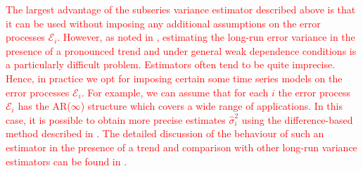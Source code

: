 \documentclass[a4paper,12pt]{article}
\makeatletter
\renewcommand{\eqref}[1]{\tagform@{\ref{#1}}}
\makeatother
\begin{document}
\textcolor{red}{The largest advantage of the subseries variance estimator described above is that it can be used without imposing any additional assumptions on the error processes $\mathcal{E}_i$. However, as noted in \cite{KhismatullinaVogt2020}, estimating the long-run error variance in the presence of a pronounced trend and under general weak dependence conditions is a particularly difficult problem. Estimators often tend to be quite imprecise. Hence, in practice we opt for imposing certain some time series models on the error processes $\mathcal{E}_i$. For example, we can assume that for each $i$ the error process $\mathcal{E}_i$ has the AR($\infty$) structure which covers a wide range of applications. In this case, it is possible to obtain more precise estimates $\widehat{\sigma}_i^2$ using the difference-based method described in \cite{KhismatullinaVogt2020}. %
The detailed discussion of the behaviour of such an estimator in the presence of a trend and comparison with other long-run variance estimators can be found in \cite{KhismatullinaVogt2020}.}


\end{document}
